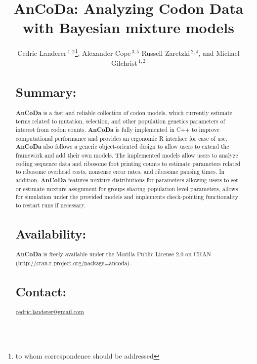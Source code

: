 \documentclass{bioinfo}
\newcommand{\pkg}[1]{{\fontseries{b}\selectfont #1}}
\newcommand{\package}{\textbf{AnCoDa }} %
\begin{document}

\title[AnCoDa]{AnCoDa: Analyzing Codon Data with Bayesian mixture models}
\author[
Landerer \textit{et~al}]{Cedric Landerer\,$^{1,2}$\footnote{
to whom correspondence should be addressed
},
Alexander Cope\,$^{3,5}$
Russell Zaretzki\,$^{2,4}$, and
Michael Gilchrist\,$^{1,2}$
}
\address{$^{1}$
Department of Ecology and Evolutionary Biology,
$^{2}$National Institute for Mathematical and Biological Synthesis,
$^{3}$Genome Science and Technology
$^{4}$Department of Statistics, Operations, and Management Science,
University of Tennessee, Knoxville, TN, USA,
$^{5}$Oak Ridge National Laboratory, Oak Ridge, TN, USA} 


\maketitle

\begin{abstract}

\section{Summary:}
\pkg{\package} is a fast and reliable collection of codon models, which currently estimate terms related to mutation, selection, and other population genetics parameters of interest from codon counts.
\package is fully implemented in C++ to improve computational performance and provides an ergonomic R interface for ease of use. 
\package also follows a generic object-oriented design to allow users to extend the framework and add their own models.
The implemented models allow users to analyze coding sequence data and ribosome foot printing counts to estimate parameters related to ribosome overhead costs, nonsense error rates, and ribosome pausing times. 
In addition, \package features mixture distributions for parameters allowing users to set or estimate mixture assignment for groups sharing population level parameters, allows for simulation under the provided models and implements check-pointing functionality to restart runs if necessary. 

\section{Availability:}
\pkg{\package} is freely available under the Mozilla Public License 2.0
on CRAN (\url{http://cran.r-project.org/package=ancoda}).

\section{Contact:} \href{cedric.landerer@gmail.com}{cedric.landerer@gmail.com}
\end{abstract}
\end{document}
